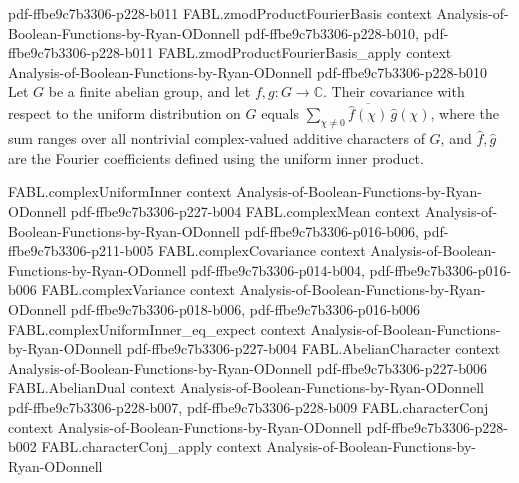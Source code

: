 \begin{theorem}
  {pdf-ffbe9c7b3306-p228-b011}
\proofstep
  {FABL.zmodProductFourierBasis}
  {context}
  {Analysis-of-Boolean-Functions-by-Ryan-ODonnell}
  {pdf-ffbe9c7b3306-p228-b010,
    pdf-ffbe9c7b3306-p228-b011}
\proofstep
  {FABL.zmodProductFourierBasis_apply}
  {context}
  {Analysis-of-Boolean-Functions-by-Ryan-ODonnell}
  {pdf-ffbe9c7b3306-p228-b010}
Let $G$ be a finite abelian group, and let $f,g:G\to\mathbb{C}$. Their covariance with respect to
the uniform distribution on $G$ equals $\sum_{\chi\ne 0}\overline{\widehat f(\chi)}\,\widehat g(\chi)$, where the sum ranges
over all nontrivial complex-valued additive characters of $G$, and $\widehat f,\widehat g$ are the Fourier coefficients defined using the uniform inner product.
\end{theorem}

\begin{theorem}
\label{FABL.complexVariance_eq_sum_fourierCoeff}
\leanok
{}
\proofstep
  {FABL.complexUniformInner}
  {context}
  {Analysis-of-Boolean-Functions-by-Ryan-ODonnell}
  {pdf-ffbe9c7b3306-p227-b004}
\proofstep
  {FABL.complexMean}
  {context}
  {Analysis-of-Boolean-Functions-by-Ryan-ODonnell}
  {pdf-ffbe9c7b3306-p016-b006,
    pdf-ffbe9c7b3306-p211-b005}
\proofstep
  {FABL.complexCovariance}
  {context}
  {Analysis-of-Boolean-Functions-by-Ryan-ODonnell}
  {pdf-ffbe9c7b3306-p014-b004,
    pdf-ffbe9c7b3306-p016-b006}
\proofstep
  {FABL.complexVariance}
  {context}
  {Analysis-of-Boolean-Functions-by-Ryan-ODonnell}
  {pdf-ffbe9c7b3306-p018-b006,
    pdf-ffbe9c7b3306-p016-b006}
\proofstep
  {FABL.complexUniformInner_eq_expect}
  {context}
  {Analysis-of-Boolean-Functions-by-Ryan-ODonnell}
  {pdf-ffbe9c7b3306-p227-b004}
\proofstep
  {FABL.AbelianCharacter}
  {context}
  {Analysis-of-Boolean-Functions-by-Ryan-ODonnell}
  {pdf-ffbe9c7b3306-p227-b006}
\proofstep
  {FABL.AbelianDual}
  {context}
  {Analysis-of-Boolean-Functions-by-Ryan-ODonnell}
  {pdf-ffbe9c7b3306-p228-b007,
    pdf-ffbe9c7b3306-p228-b009}
\proofstep
  {FABL.characterConj}
  {context}
  {Analysis-of-Boolean-Functions-by-Ryan-ODonnell}
  {pdf-ffbe9c7b3306-p228-b002}
\proofstep
  {FABL.characterConj_apply}
  {context}
  {Analysis-of-Boolean-Functions-by-Ryan-ODonnell}

\end{theorem}
